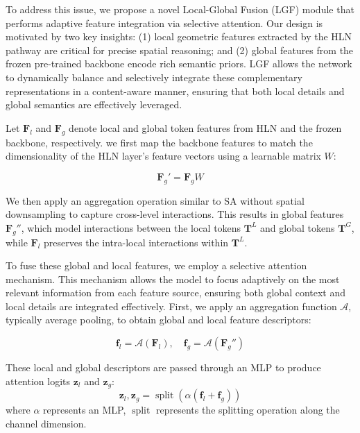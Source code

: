 To address this issue, we propose a novel Local-Global Fusion (LGF) module that performs adaptive feature integration via selective attention. Our design is motivated by two key insights: (1) local geometric features extracted by the HLN pathway are critical for precise spatial reasoning; and (2) global features from the frozen pre-trained backbone encode rich semantic priors. LGF allows the network to dynamically balance and selectively integrate these complementary representations in a content-aware manner, ensuring that both local details and global semantics are effectively leveraged.

Let $\mathbf{F}_l$ and $\mathbf{F}_g$ denote local and global token features from HLN and the frozen backbone, respectively. we first map the backbone features to match the dimensionality of the HLN layer’s feature vectors using a learnable matrix $W$:

\begin{equation}
	\mathbf{F}_g' = \mathbf{F}_g W
\end{equation}

We then apply an aggregation operation similar to SA without spatial downsampling to capture cross-level interactions. This results in global features $\mathbf{F}_g''$, which model interactions between the local tokens $\mathbf{T}^{L}$ and global tokens $\mathbf{T}^{G}$, while $\mathbf{F}_l$ preserves the intra-local interactions within $\mathbf{T}^{L}$.

To fuse these global and local features, we employ a selective attention mechanism. This mechanism allows the model to focus adaptively on the most relevant information from each feature source, ensuring both global context and local details are integrated effectively. First, we apply an aggregation function $\mathcal{A}$, typically average pooling, to obtain global and local feature descriptors:

\begin{equation}
	\mathbf{f}_l = \mathcal{A}(\mathbf{F}_l), \quad \mathbf{f}_g = \mathcal{A}(\mathbf{F}_g'')
\end{equation}

These local and global descriptors are passed through an MLP to produce attention logits $\mathbf{z}_l$ and $\mathbf{z}_g$:
\begin{equation}
	\mathbf{z}_l, \mathbf{z}_g = \operatorname{split}\left( \alpha \left( \mathbf{f}_l + \mathbf{f}_g \right) \right)
\end{equation}
where $\alpha$ represents an MLP, $\operatorname{split}$ represents the splitting operation along the channel dimension.

